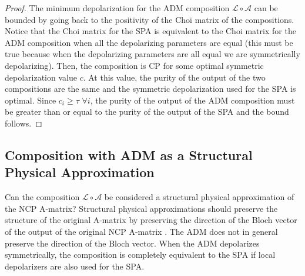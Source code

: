 \documentclass[12pt]{iopart}
\begin{document}
\begin{proof}
    The minimum depolarization for the ADM composition $\mathcal{L}\circ\mathcal{A}$ can be bounded by going back to the positivity of the Choi matrix of the compositions. %
    Notice that the Choi matrix for the SPA is equivalent to the Choi matrix for the ADM composition when all the depolarizing parameters are equal (this must be true because when the depolarizing parameters are all equal we are symmetrically depolarizing). Then, the composition is CP for some optimal symmetric depolarization value $c$. At this value, the purity of the output of the two compositions are the same and the symmetric depolarization used for the SPA is optimal. Since $c_i\geq \tau$ $\forall i$, the purity of the output of the ADM composition must be greater than or equal to the purity of the output of the SPA and the bound follows.
\end{proof}

\subsection{Composition with ADM as a Structural Physical Approximation}
Can the composition $\mathcal{L}\circ\mathcal{A}$ be considered a structural physical approximation of the NCP A-matrix? Structural physical approximations should preserve the structure of the original A-matrix by preserving the direction of the Bloch vector of the output of the original NCP A-matrix \cite{horodecki2001limits}. The ADM does not in general preserve the direction of the Bloch vector. When the ADM depolarizes symmetrically, the composition is completely equivalent to the SPA if local depolarizers are also used for the SPA.
\end{document}
